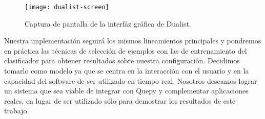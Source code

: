 \begin{figure}
\caption{Captura de pantalla de la interfáz gráfica de Dualist.}
\texttt{[image: dualist-screen]}
\centering
\end{figure}

Nuestra implementación seguirá los mismos lineamientos principales y pondremos en práctica las técnicas de selección de ejemplos con las de entrenamiento del clasificador para obtener resultados sobre nuestra configuración. Decidimos tomarlo como modelo ya que se centra en la interacción con el usuario y en la capacidad del software de ser utilizado en tiempo real. Nosotros deseamos lograr un sistema que sea viable de integrar con Quepy y complementar aplicaciones reales, en lugar de ser utilizado sólo para demostrar los resultados de este trabajo.

